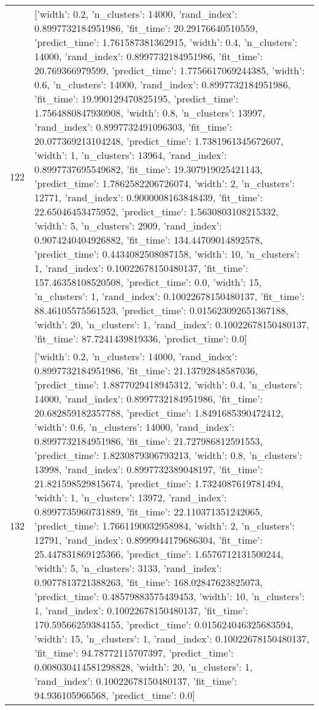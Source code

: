 \begin{tabular}{rl}
122 & [{'width': 0.2, 'n_clusters': 14000, 'rand_index': 0.8997732184951986, 'fit_time': 20.29176640510559, 'predict_time': 1.761587381362915}, {'width': 0.4, 'n_clusters': 14000, 'rand_index': 0.8997732184951986, 'fit_time': 20.769366979599, 'predict_time': 1.7756617069244385}, {'width': 0.6, 'n_clusters': 14000, 'rand_index': 0.8997732184951986, 'fit_time': 19.990129470825195, 'predict_time': 1.7564880847930908}, {'width': 0.8, 'n_clusters': 13997, 'rand_index': 0.8997732491096303, 'fit_time': 20.077369213104248, 'predict_time': 1.7381961345672607}, {'width': 1, 'n_clusters': 13964, 'rand_index': 0.8997737695549682, 'fit_time': 19.307919025421143, 'predict_time': 1.7862582206726074}, {'width': 2, 'n_clusters': 12771, 'rand_index': 0.9000008163848439, 'fit_time': 22.65046453475952, 'predict_time': 1.5630803108215332}, {'width': 5, 'n_clusters': 2909, 'rand_index': 0.9074240404926882, 'fit_time': 134.44709014892578, 'predict_time': 0.4434082508087158}, {'width': 10, 'n_clusters': 1, 'rand_index': 0.10022678150480137, 'fit_time': 157.46358108520508, 'predict_time': 0.0}, {'width': 15, 'n_clusters': 1, 'rand_index': 0.10022678150480137, 'fit_time': 88.46105575561523, 'predict_time': 0.015623092651367188}, {'width': 20, 'n_clusters': 1, 'rand_index': 0.10022678150480137, 'fit_time': 87.7241439819336, 'predict_time': 0.0}] \\
132 & [{'width': 0.2, 'n_clusters': 14000, 'rand_index': 0.8997732184951986, 'fit_time': 21.13792848587036, 'predict_time': 1.8877029418945312}, {'width': 0.4, 'n_clusters': 14000, 'rand_index': 0.8997732184951986, 'fit_time': 20.682859182357788, 'predict_time': 1.8491685390472412}, {'width': 0.6, 'n_clusters': 14000, 'rand_index': 0.8997732184951986, 'fit_time': 21.727986812591553, 'predict_time': 1.8230879306793213}, {'width': 0.8, 'n_clusters': 13998, 'rand_index': 0.8997732389048197, 'fit_time': 21.821598529815674, 'predict_time': 1.7324087619781494}, {'width': 1, 'n_clusters': 13972, 'rand_index': 0.8997735960731889, 'fit_time': 22.110371351242065, 'predict_time': 1.7661190032958984}, {'width': 2, 'n_clusters': 12791, 'rand_index': 0.8999944179686304, 'fit_time': 25.447831869125366, 'predict_time': 1.6576712131500244}, {'width': 5, 'n_clusters': 3133, 'rand_index': 0.9077813721388263, 'fit_time': 168.02847623825073, 'predict_time': 0.48579883575439453}, {'width': 10, 'n_clusters': 1, 'rand_index': 0.10022678150480137, 'fit_time': 170.59566259384155, 'predict_time': 0.015624046325683594}, {'width': 15, 'n_clusters': 1, 'rand_index': 0.10022678150480137, 'fit_time': 94.78772115707397, 'predict_time': 0.008030414581298828}, {'width': 20, 'n_clusters': 1, 'rand_index': 0.10022678150480137, 'fit_time': 94.936105966568, 'predict_time': 0.0}] \\

\end{tabular}
